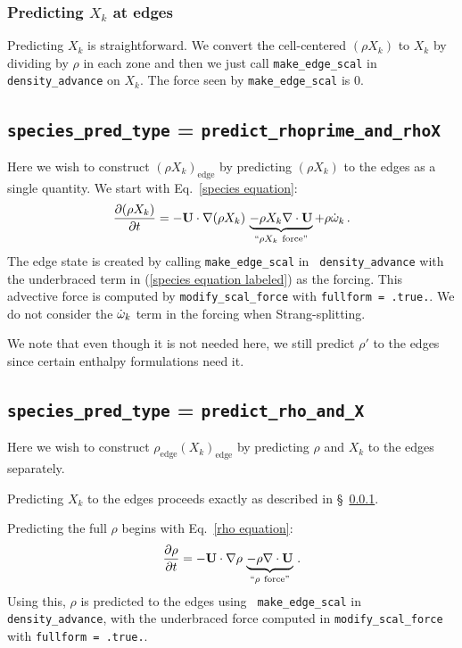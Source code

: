 \subsubsection{Predicting $X_k$ at edges}
\label{sec:pert:predict_X}
Predicting $X_k$ is straightforward.  We convert the cell-centered
$(\rho X_k)$ to $X_k$ by dividing by $\rho$ in each zone and then we
just call {\tt make\_edge\_scal} in {\tt density\_advance} on $X_k$.
The force seen by {\tt make\_edge\_scal} is 0.


\subsection{{\tt species\_pred\_type} = {\tt predict\_rhoprime\_and\_rhoX}}

Here we wish to construct $(\rho X_k)_\mathrm{edge}$ by predicting
$(\rho X_k)$ to the edges as a single quantity.  We start with
Eq.~\ref{species equation}:
\begin{equation}
\frac{\partial(\rho X_k)}{\partial t} =
  -{\bf U}\cdot\nabla(\rho X_k) \, \underbrace{-\rho X_k \nabla\cdot{\bf U}}_{``\rho X_k ~\text{force''}} + \rho \dot{\omega}_k \, . \label{species equation labeled}
\end{equation}
The edge state is created by calling {\tt make\_edge\_scal} in {\tt
  density\_advance} with the underbraced term in (\ref{species
  equation labeled}) as the forcing.  This advective force is computed
by {\tt modify\_scal\_force} with {\tt fullform = .true.}.  We do not
consider the $\dot{\omega}_k$ term in the forcing when Strang-splitting.


We note that even though it is not needed here, we still predict
$\rho'$ to the edges since certain enthalpy formulations need it.


\subsection{{\tt species\_pred\_type} = {\tt predict\_rho\_and\_X}}

Here we wish to construct $\rho_\mathrm{edge} (X_k)_\mathrm{edge}$
by predicting $\rho$ and $X_k$ to the edges separately.

Predicting $X_k$ to the edges proceeds exactly as described in
\S~\ref{sec:pert:predict_X}.  

Predicting the full $\rho$ begins with Eq.~\ref{rho equation}:
\begin{equation}
\frac{\partial\rho}{\partial t} 
= -{\bf U}\cdot\nabla\rho \, \underbrace{- \rho\nabla\cdot{\bf U}}_{``\rho~\text{force''}} \, . \label{rho equation labeled}
\end{equation}
Using this, $\rho$ is predicted to the edges using {\tt
  make\_edge\_scal} in {\tt density\_advance}, with the underbraced
force computed in {\tt modify\_scal\_force} with {\tt fullform =
  .true.}.

